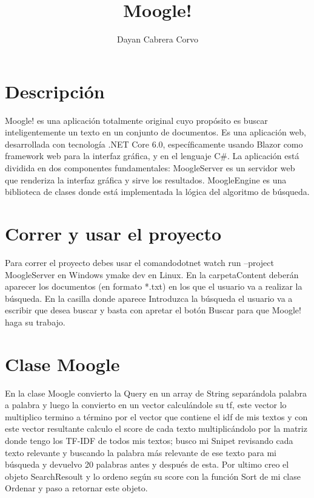\documentclass{article}
\begin{document}
\title{\textbf{Moogle!}}
\author{Dayan Cabrera Corvo}
\date{}

\maketitle

\section* {Descripción}
 Moogle! es una aplicación totalmente original cuyo propósito es buscar inteligentemente un texto en un conjunto de documentos. Es una aplicación web, desarrollada con tecnología .NET Core 6.0, específicamente usando Blazor como framework web para la interfaz gráfica, y en el lenguaje C\#{}. La aplicación está dividida en dos componentes fundamentales: MoogleServer es un servidor web que renderiza la interfaz gráfica y sirve los resultados. MoogleEngine es una biblioteca de clases donde está implementada la lógica del algoritmo de búsqueda.



\vspace{10pt}

\section* {Correr y usar el proyecto}
 Para correr el proyecto debes usar el comandodotnet watch run --project MoogleServer en Windows ymake dev en Linux. En la carpetaContent deberán aparecer los documentos (en formato *.txt) en los que el usuario va a realizar la búsqueda. En la casilla donde aparece Introduzca la búsqueda el usuario va a escribir que desea buscar y basta con apretar el botón Buscar para que Moogle! haga su trabajo.
\vspace{10pt}

\section* {Clase Moogle}
En la clase Moogle convierto la Query en un array de String separándola palabra a palabra y luego la convierto en un vector calculándole su tf, este vector lo multiplico termino a término por el vector que contiene el idf de mis textos y con este vector resultante calculo el score de cada texto multiplicándolo por la matriz donde tengo los TF-IDF de todos mis textos; busco mi Snipet revisando cada texto relevante y buscando la palabra más relevante de ese texto para mi búsqueda y devuelvo 20 palabras antes y después de esta. Por ultimo creo el objeto SearchResoult y lo ordeno según su score con la función Sort de mi clase Ordenar y paso a retornar este objeto.
\end{document}
